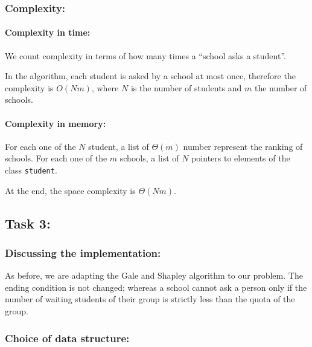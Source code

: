 \documentclass[11pt]{article}
\begin{document}
    \hypertarget{complexity}{%
\subsubsection{Complexity:}\label{complexity}}

\hypertarget{complexity-in-time}{%
\paragraph{Complexity in time:}\label{complexity-in-time}}

We count complexity in terms of how many times a ``school asks a
student''.

In the algorithm, each student is asked by a school at most once,
therefore the complexity is \(O(N m)\), where \(N\) is the number of
students and \(m\) the number of schools.

\hypertarget{complexity-in-memory}{%
\paragraph{Complexity in memory:}\label{complexity-in-memory}}

For each one of the \(N\) student, a list of \(\Theta(m)\) number
represent the ranking of schools. For each one of the \(m\) schools, a
list of \(N\) pointers to elements of the class \texttt{student}.

At the end, the space complexity is \(\Theta(N m)\).

    \hypertarget{task-3}{%
\subsection{Task 3:}\label{task-3}}

    \hypertarget{discussing-the-implementation}{%
\subsubsection{Discussing the
implementation:}\label{discussing-the-implementation}}

As before, we are adapting the Gale and Shapley algorithm to our
problem. The ending condition is not changed; whereas a school cannot
ask a person only if the number of waiting students of their group is
strictly less than the quota of the group.

    \hypertarget{choice-of-data-structure}{%
\subsubsection{Choice of data
structure:}\label{choice-of-data-structure}}
\end{document}
